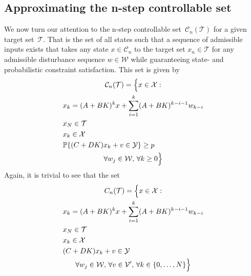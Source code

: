 \documentclass{ifacconf}
\providecommand{\C}{\mathcal C}
\providecommand{\W}{\mathcal W}
\providecommand{\V}{\mathcal V}
\providecommand{\X}{\mathcal X}
\providecommand{\Y}{\mathcal Y}
\providecommand{\T}{\mathcal T}
\providecommand{\PP}{\mathbb P}
\begin{document}
\subsection{Approximating the n-step controllable set}\label{ssec:approximating:n:step}
%
We now turn our attention to the n-step controllable set~$\C_n(\T)$ for a given target set~$\T$.
%
That is the set of all states such that a sequence of admissible inputs exists that takes any state $x\in\C_n$ to the target set $x_n\in\T$ for any admissible disturbance sequence $w\in\W$ while guaranteeing state- and probabilistic constraint satisfaction.
%
This set is given by
%
\begin{multline*}
\C_n(\T) = \Bigl\{x\in\X: \\
\begin{aligned}
&x_k = (A+BK)^k x + \sum_{i=1}^{k} (A+BK)^{k-i-1} w_{k-i}\\
&x_N\in\T\\
&x_k\in\X\\
&\PP\{(C+DK)x_k+v\in\Y\}\geq p
\end{aligned}\\
\forall w_j\in\W,\, \forall k\geq 0 \Bigr\}	
\end{multline*}
%
Again, it is trivial to see that the set
%
\begin{multline*}
C_n(\T) = \Bigl\{ x\in\X: \\
\begin{aligned}
&x_k = (A+BK)^k x + \sum_{i=1}^{k} (A+BK)^{k-i-1} w_{k-i}\\
&x_N\in\T\\
&x_k\in\X\\
&(C+DK)x_k+v\in\Y
\end{aligned}\\
\forall w_j\in\W,\, \forall v\in \V^\prime,\, \forall k\in\{0,\dots,N\} \Bigr\}	
\end{multline*}
\end{document}
